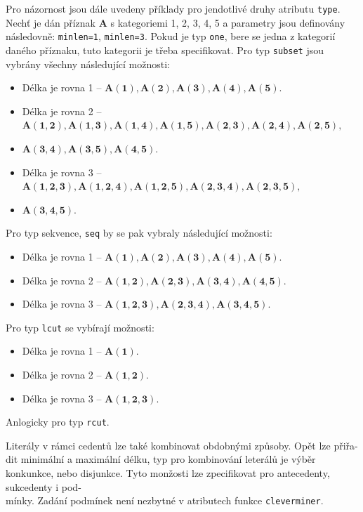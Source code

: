 Pro názornost jsou dále uvedeny příklady pro jendotlivé druhy atributu \texttt{type}. Nechť je dán příznak $\mathbf{A}$ s kategoriemi 1, 2, 3, 4, 5 a parametry jsou definovány následovně: \texttt{minlen=1}, \texttt{minlen=3}. Pokud je typ \texttt{one}, bere se jedna z kategorií daného příznaku, tuto kategorii je třeba specifikovat. Pro typ \texttt{subset} jsou vybrány všechny následující možnosti:
\begin{itemize}
    \itemsep0em
    \item Délka je rovna 1 --  $\mathbf{A(1), A(2), A(3), A(4), A(5)}.$
    \item Délka je rovna 2 --  $\mathbf{A(1, 2), A(1, 3), A(1, 4), A(1, 5), A(2, 3), A(2, 4), A(2, 5)},$
    \item[] $\mathbf{A(3, 4), A(3, 5), A(4, 5)}.$
    \item Délka je rovna 3 --  $\mathbf{A(1, 2, 3), A(1, 2, 4), A(1, 2, 5),A(2, 3, 4), A(2, 3, 5),}$
    \item[] $\mathbf{A(3, 4, 5)}$.\cite{bib:GUHA}
\end{itemize}
Pro typ sekvence, \texttt{seq} by se pak vybraly následující možnosti:
\begin{itemize}
    \itemsep0em
    \item Délka je rovna 1 --  $\mathbf{A(1), A(2), A(3), A(4), A(5)}.$
    \item Délka je rovna 2 --  $\mathbf{A(1, 2), A(2, 3), A(3, 4), A(4, 5)}.$
    \item Délka je rovna 3 --  $\mathbf{A(1, 2, 3), A(2, 3, 4), A(3, 4, 5)}$.\cite{bib:GUHA}
\end{itemize}

Pro typ \texttt{lcut} se vybírají možnosti:
\begin{itemize}
    \itemsep0em
    \item Délka je rovna 1 --  $\mathbf{A(1)}.$
    \item Délka je rovna 2 --  $\mathbf{A(1, 2)}.$
    \item Délka je rovna 3 --  $\mathbf{A(1, 2, 3)}$.\cite{bib:GUHA}
\end{itemize}
Anlogicky pro typ \texttt{rcut}.

Literály v rámci cedentů lze také kombinovat obdobnými způsoby. Opět lze přiřa-\\dit minimální a maximální délku, typ pro kombinování leterálů je výběr konkunkce, nebo disjunkce. Tyto monžosti lze zpecifikovat pro antecedenty, sukcedenty i pod-\\mínky. Zadání podmínek není nezbytné v atributech funkce \texttt{cleverminer}.

